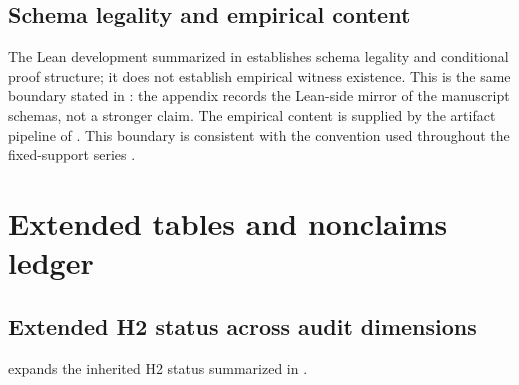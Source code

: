 \documentclass[11pt]{article}
\newcommand{\OldLayer}{H2}
\theoremstyle{definition}
\begin{document}
\subsection{Schema legality and empirical content}\label{subsec:lean-boundary}

The Lean development summarized in
 establishes
schema legality and conditional proof structure; it does not establish
empirical witness existence.  This is the same boundary stated in
: the appendix records the Lean-side
mirror of the manuscript schemas, not a stronger claim.  The empirical content
is supplied by the artifact pipeline of
.  This boundary is
consistent with the convention used throughout the fixed-support series
\cite{Tsiokos2026FoundationsII,Tsiokos2026CarrierToEvent,Tsiokos2026CarrierExactification,Tsiokos2026PromotionCriteria,Tsiokos2026InternalStructure}.
 \section{Extended tables and nonclaims ledger}\label{app:extended-material}

\subsection{Extended \OldLayer{} status across audit dimensions}\label{subsec:extended-table-h2-status}

 expands the inherited \OldLayer{} status
summarized in .
\end{document}
